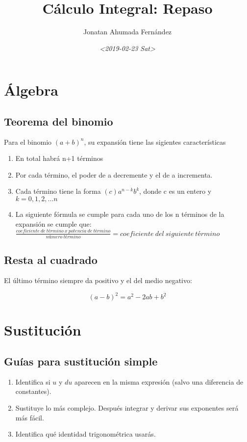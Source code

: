 \documentclass[11pt]{article}
\author{Jonatan Ahumada Fernández}
\date{\textit{<2019-02-23 Sat>}}
\title{Cálculo Integral: Repaso}
\begin{document}
\maketitle
\tableofcontents


\section{Álgebra}
\label{sec-1}

\subsection{Teorema del binomio}
\label{sec-1-1}
Para el binomio \( (a + b)^n\), su expansión tiene las sigientes características
\begin{enumerate}
\item En total habrá n+1 términos
\item Por cada término, el poder de a decremente y el de a incrementa.
\item Cada término tiene la forma \((c)a^{n-k}{b^k}\), donde c es un entero y \(k = 0,1,2, \dots n\)
\item La siguiente fórmula se cumple para cada uno de los n términos de la expansión se cumple que: \(\frac{coeficiente\ de\ término\ x\ potencia\ de\ término}{número\ término} = coeficiente\ del\ siguiente\ término\)
\end{enumerate}

\subsection{Resta al cuadrado}
\label{sec-1-2}
El último término siempre da positivo y el del medio negativo:

\[(a-b)^2 = a^2 -2ab + b^2\]   


\section{Sustitución}
\label{sec-2}
\subsection{Guías para sustitución simple}
\label{sec-2-1}
\begin{enumerate}
\item Identifica si \(u\) y \(du\) aparecen en la misma expresión (salvo una diferencia de constantes).
\item Sustituye lo más complejo. Después integrar y derivar sus exponentes será más fácil.
\item Identifica qué identidad trigonométrica usarás.
\end{enumerate}
\end{document}
